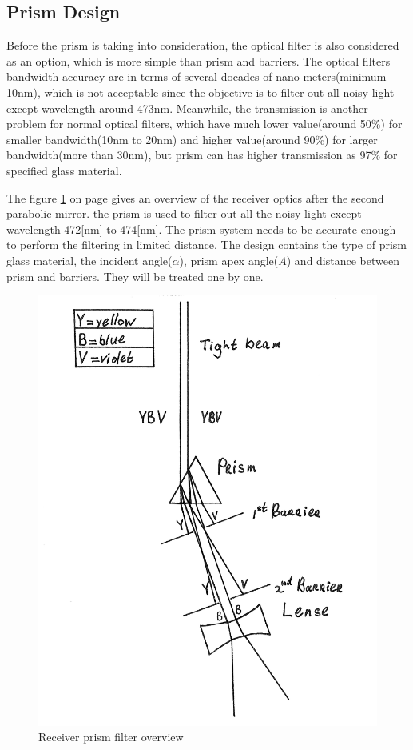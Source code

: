 \subsection{Prism Design}
\label{prism}
Before the prism is taking into consideration, the optical filter is also considered as an option, which is more simple than prism and barriers. The optical filters bandwidth accuracy are in terms of several docades of nano meters(minimum 10nm\cite{optical_filter}), which is not acceptable since the objective is to filter out all noisy light except wavelength around 473nm. Meanwhile, the transmission is another problem for normal optical filters, which have much lower value(around 50\%) for smaller bandwidth(10nm to 20nm) and higher value(around 90\%) for larger bandwidth(more than 30nm), but prism can has higher transmission as 97\% for specified glass material.

The figure \ref{fig:prism} on page \pageref{fig:prism} gives an overview of the receiver optics after the second parabolic mirror. the prism is used to filter out all the noisy light except wavelength 472[nm] to 474[nm]. The prism system needs to be accurate enough to perform the filtering in limited distance. The design contains the type of prism glass material, the incident angle($\alpha$), prism apex angle($A$) and distance between prism and barriers. They will be treated one by one.

\begin{figure}[ht!]
\centering
\includegraphics[scale = 0.8]{chapters/img/Prism.png}
\caption{Receiver prism filter overview}
\label{fig:prism}
\end{figure} 


